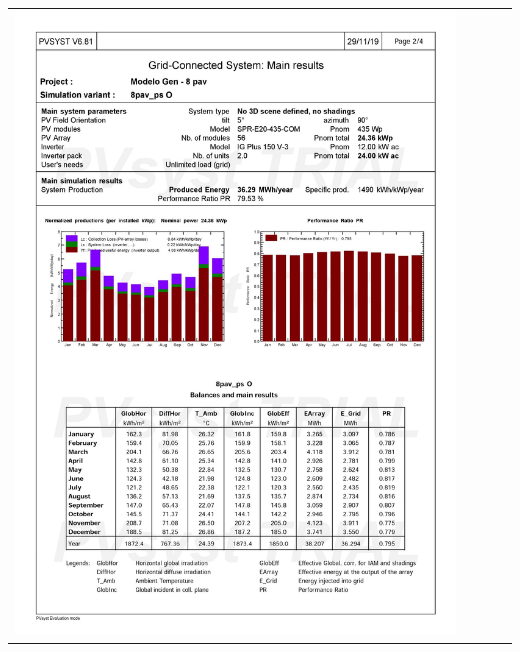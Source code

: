 \begin{table}[H]
    \centering
    \begin{tabular}{l}
        \includegraphics[width=0.9\textwidth]{figures/attachments/resultpv20.jpg}
    \end{tabular}
\end{table}
